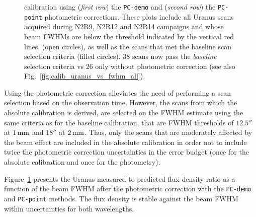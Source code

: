 \begin{figure}[!htbp]
\begin{center}
{{      calibration using (\emph{first row}) the {\tt PC-demo} and (\emph{second
        row}) the {\tt PC-point} photometric corrections. These plots
      include all Uranus scans acquired during N2R9, N2R12 and N2R14
      campaigns and whose beam FWHMs are below the threshold indicated
      by the vertical red lines, (open circles), as
      well as the scans that met the baseline scan selection criteria (filled
      circles). 38 scans now pass the \emph{baseline} selection criteria vs 26
      only without photometric correction (see also Fig.~\ref{fig:calib_uranus_vs_fwhm_all}).}}
\label{fig:calib_uranus_vs_fwhm_photocorr}
\end{center}
\end{figure}

Using the photometric correction alleviates the need of
performing a scan selection based on the observation time. However,
the scans from which the absolute calibration is derived, are selected
on the FWHM estimate using the same criteria as for the baseline
calibration, that are FWHM thresholds of $12.5''$ at $1\, \rm{mm}$ and $18''$ at
$2\, \rm{mm}$. Thus, only the scans that are moderately affected by the beam
effect are included in the absolute calibration in order not to
include twice the photometric correction uncertainties in the error
budget (once for the absolute calibration and once for the photometry).

Figure~\ref{fig:calib_uranus_vs_fwhm_photocorr} presents the Uranus
measured-to-predicted flux density ratio as a function of the beam FWHM
after the photometric correction with the {\tt PC-demo} and
{\tt PC-point} methods. The flux
density is stable against the beam FWHM within uncertainties for both
wavelengths.

